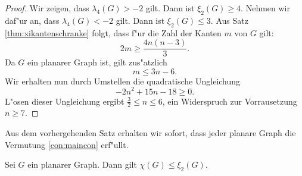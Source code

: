 \begin{proof}
  Wir zeigen, dass $\lambda_4(G) > -2$ gilt. Dann ist $\xi_{2}(G) \geq 4$. 
  Nehmen wir daf"ur an, dass $\lambda_{4}(G) < -2$ gilt.
  Dann ist $\xi_{2}(G)\leq 3$. Aus Satz \ref{thm:xikantenschranke} folgt, dass f"ur die Zahl der Kanten $m$ von $G$ gilt:
  $$2m \geq \frac{4n(n-3)}{3}.$$
  Da $G$ ein planarer Graph ist, gilt zus"atzlich $$ m \leq 3n-6.$$
  Wir erhalten nun durch Umstellen die quadratische Ungleichung $$-2n^{2} +15n -18 \geq 0.$$
  L"osen dieser Ungleichung ergibt $ \frac{3}{2} \leq n \leq 6$, ein Widerspruch zur Vorrausetzung $n\geq 7$.
\end{proof} 
Aus dem vorhergehenden Satz erhalten wir sofort, dass jeder planare Graph die Vermutung \ref{con:maincon} erf"ullt.
\begin{corollary}
  Sei $G$ ein planarer Graph. Dann gilt $\chi(G) \leq \xi_{2}(G) $. 
\end{corollary}
